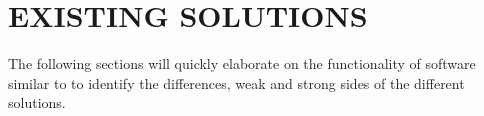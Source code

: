 \chapter{EXISTING SOLUTIONS}
\label{chap:existing_solutions}
The following sections will quickly elaborate on the functionality of software
similar to \snowman{} to identify the differences, weak and strong sides of the
different solutions.




